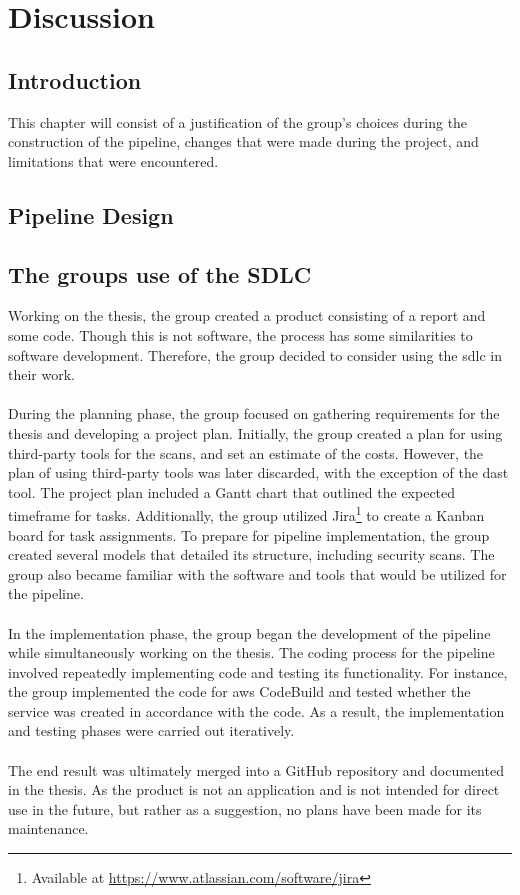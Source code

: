 \chapter{Discussion}
\section{Introduction}
This chapter will consist of a justification of the group's choices during the construction of the pipeline, changes that were made during the project, and limitations that were encountered.  

\section{Pipeline Design}

\section{The groups use of the SDLC} %
Working on the thesis, the group created a product consisting of a report and some code. Though this is not software, the process has some similarities to software development. Therefore, the group decided to consider using the \acrshort{sdlc} in their work.
\\~\\
During the planning phase, the group focused on gathering requirements for the thesis and developing a project plan. Initially, the group created a plan for using third-party tools for the scans, and set an estimate of the costs. However, the plan of using third-party tools was later discarded, with the exception of the \acrshort{dast} tool. The project plan included a Gantt chart that outlined the expected timeframe for tasks. Additionally, the group utilized Jira\footnote{Available at \url{https://www.atlassian.com/software/jira}} to create a Kanban board for task assignments. To prepare for pipeline implementation, the group created several models that detailed its structure, including security scans. The group also became familiar with the software and tools that would be utilized for the pipeline.
\\~\\
In the implementation phase, the group began the development of the pipeline while simultaneously working on the thesis. The coding process for the pipeline involved repeatedly implementing code and testing its functionality. For instance, the group implemented the code for \acrshort{aws} CodeBuild and tested whether the service was created in accordance with the code. As a result, the implementation and testing phases were carried out iteratively.
\\~\\
The end result was ultimately merged into a GitHub repository and documented in the thesis. As the product is not an application and is not intended for direct use in the future, but rather as a suggestion, no plans have been made for its maintenance. 

